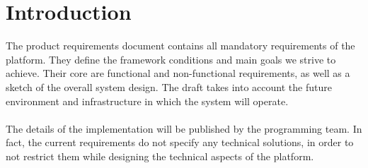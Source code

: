 \chapter{Introduction}
The product requirements document contains all mandatory requirements of the platform. They define the framework conditions and main goals we strive to achieve. Their core are functional and non-functional requirements, as well as a sketch of the overall system design. The draft takes into account the future environment and infrastructure in which the system will operate. 
\\\\
The details of the implementation will be published by the programming team. In fact, the current requirements do not specify any technical solutions, in order to not restrict them while designing the technical aspects of the platform.
